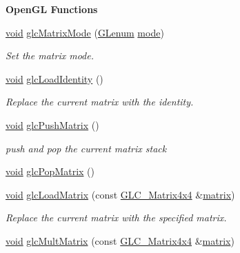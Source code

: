 \begin{Indent}{\bf Open\-G\-L Functions}\par
\begin{DoxyCompactItemize}
\item 
\hyperlink{group___u_a_v_objects_plugin_ga444cf2ff3f0ecbe028adce838d373f5c}{void} \hyperlink{class_g_l_c___context_a30375a4d8e2427b8044434c18b2b2804}{glc\-Matrix\-Mode} (\hyperlink{glext_8h_a508b2dec21679e2e346cad3e0d1969bf}{G\-Lenum} \hyperlink{glext_8h_a1e71d9c196e4683cc06c4b54d53f7ef5}{mode})
\begin{DoxyCompactList}\small\item\em Set the matrix mode. \end{DoxyCompactList}\item 
\hyperlink{group___u_a_v_objects_plugin_ga444cf2ff3f0ecbe028adce838d373f5c}{void} \hyperlink{class_g_l_c___context_abe6ec1f67d305aaab30fa944ed3f7351}{glc\-Load\-Identity} ()
\begin{DoxyCompactList}\small\item\em Replace the current matrix with the identity. \end{DoxyCompactList}\item 
\hyperlink{group___u_a_v_objects_plugin_ga444cf2ff3f0ecbe028adce838d373f5c}{void} \hyperlink{class_g_l_c___context_a1e1d6a92c5b2a455c1d446db7ca42db0}{glc\-Push\-Matrix} ()
\begin{DoxyCompactList}\small\item\em push and pop the current matrix stack \end{DoxyCompactList}\item 
\hyperlink{group___u_a_v_objects_plugin_ga444cf2ff3f0ecbe028adce838d373f5c}{void} \hyperlink{class_g_l_c___context_a95d89a98839dfbad6780f4e21ffcd33e}{glc\-Pop\-Matrix} ()
\item 
\hyperlink{group___u_a_v_objects_plugin_ga444cf2ff3f0ecbe028adce838d373f5c}{void} \hyperlink{class_g_l_c___context_ab3160bff555487a7c9206c0f65f5ade4}{glc\-Load\-Matrix} (const \hyperlink{class_g_l_c___matrix4x4}{G\-L\-C\-\_\-\-Matrix4x4} \&\hyperlink{glext_8h_a7b24a3f2f56eb1244ae69dacb4fecb6f}{matrix})
\begin{DoxyCompactList}\small\item\em Replace the current matrix with the specified matrix. \end{DoxyCompactList}\item 
\hyperlink{group___u_a_v_objects_plugin_ga444cf2ff3f0ecbe028adce838d373f5c}{void} \hyperlink{class_g_l_c___context_a0ccbd2d753859fddf5b3ece29e212bc2}{glc\-Mult\-Matrix} (const \hyperlink{class_g_l_c___matrix4x4}{G\-L\-C\-\_\-\-Matrix4x4} \&\hyperlink{glext_8h_a7b24a3f2f56eb1244ae69dacb4fecb6f}{matrix})

\end{DoxyCompactItemize}
\end{Indent}
